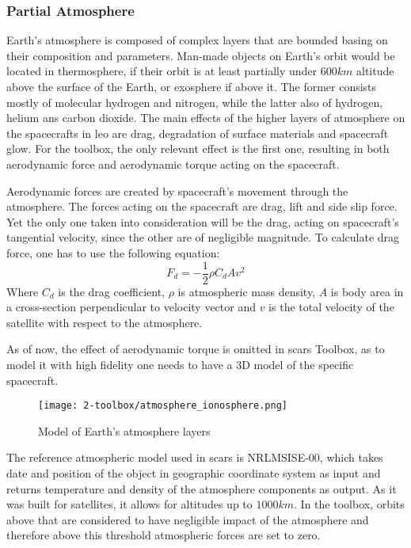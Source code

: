     \subsubsection{Partial Atmosphere}\label{toolbox:atmosphere}
        Earth's atmosphere is composed of complex layers that are bounded basing on their composition and parameters. Man-made objects on Earth's orbit would be located in thermosphere, if their orbit is at least partially under $600km$ altitude above the surface of the Earth, or exosphere if above it. The former consists mostly of molecular hydrogen and nitrogen, while the latter also of hydrogen, helium ans carbon dioxide. The main effects of the higher layers of atmosphere on the spacecrafts in \ac{leo} are drag, degradation of surface materials and spacecraft glow. For the toolbox, the only relevant effect is the first one, resulting in both aerodynamic force and aerodynamic torque acting on the spacecraft.

        Aerodynamic forces are created by spacecraft's movement through the atmosphere. The forces acting on the spacecraft are drag, lift and side slip force. Yet the only one taken into consideration will be the drag, acting on spacecraft's tangential velocity, since the other are of negligible magnitude. To calculate drag force, one has to use the following equation:
        \begin{equation}
            F_d = -\frac{1}{2}\rho C_d A v^2
        \end{equation}
        Where $C_d$ is the drag coefficient, $\rho$ is atmospheric mass density, $A$ is body area in a cross-section perpendicular to velocity vector and $v$ is the total velocity of the satellite with respect to the atmosphere.

        As of now, the effect of aerodynamic torque is omitted in \ac{scars} Toolbox, as to model it with high fidelity one needs to have a 3D model of the specific spacecraft.


        \begin{figure}[H]
            \centering
            \texttt{[image: 2-toolbox/atmosphere\_ionosphere.png]}
            \caption{Model of Earth's atmosphere layers}
            \label{fig:atmosphere}
        \end{figure}

        The reference atmospheric model used in \ac{scars} is NRLMSISE-00, which takes date and position of the object in geographic coordinate system as input and returns temperature and density of the atmosphere components as output. As it was built for satellites, it allows for altitudes up to $1000km$. In the toolbox, orbits above that are considered to have negligible impact of the atmosphere and therefore above this threshold atmospheric forces are set to zero.

